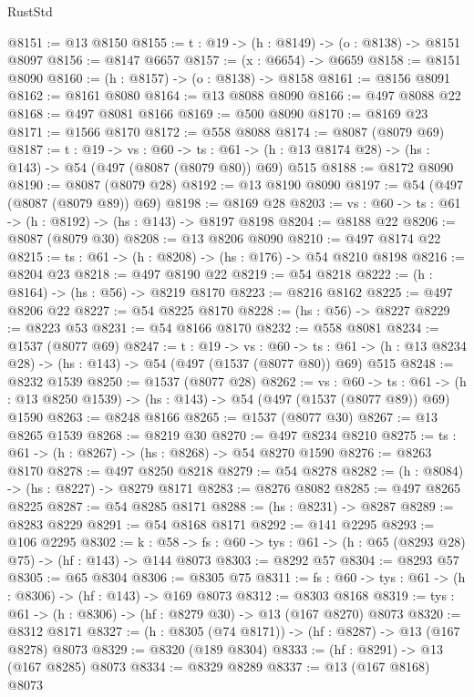 \begin{lexlean}{RustStd}
\begin{coremodule}
@8151 := @13 @8150
@8155 := {t : @19} -> (h : @8149) -> (o : @8138) -> @8151 @8097
@8156 := @8147 @6657
@8157 := (x : @6654) -> @6659
@8158 := @8151 @8090
@8160 := (h : @8157) -> (o : @8138) -> @8158
@8161 := @8156 @8091
@8162 := @8161 @8080
@8164 := @13 @8088 @8090
@8166 := @497 @8088 @22
@8168 := @497 @8081 @8166
@8169 := @500 @8090
@8170 := @8169 @23
@8171 := @1566 @8170
@8172 := @558 @8088
@8174 := @8087 (@8079 @69)
@8187 := {t : @19} ->
  {vs : @60} ->
  {ts : @61} -> (h : @13 @8174 @28) -> (hs : @143) -> @54 (@497 (@8087 (@8079 @80)) @69) @515
@8188 := @8172 @8090
@8190 := @8087 (@8079 @28)
@8192 := @13 @8190 @8090
@8197 := @54 (@497 (@8087 (@8079 @89)) @69)
@8198 := @8169 @28
@8203 := {vs : @60} -> {ts : @61} -> (h : @8192) -> (hs : @143) -> @8197 @8198
@8204 := @8188 @22
@8206 := @8087 (@8079 @30)
@8208 := @13 @8206 @8090
@8210 := @497 @8174 @22
@8215 := {ts : @61} -> (h : @8208) -> (hs : @176) -> @54 @8210 @8198
@8216 := @8204 @23
@8218 := @497 @8190 @22
@8219 := @54 @8218
@8222 := (h : @8164) -> (hs : @56) -> @8219 @8170
@8223 := @8216 @8162
@8225 := @497 @8206 @22
@8227 := @54 @8225 @8170
@8228 := (hs : @56) -> @8227
@8229 := @8223 @53
@8231 := @54 @8166 @8170
@8232 := @558 @8081
@8234 := @1537 (@8077 @69)
@8247 := {t : @19} ->
  {vs : @60} ->
  {ts : @61} -> (h : @13 @8234 @28) -> (hs : @143) -> @54 (@497 (@1537 (@8077 @80)) @69) @515
@8248 := @8232 @1539
@8250 := @1537 (@8077 @28)
@8262 := {vs : @60} ->
  {ts : @61} -> (h : @13 @8250 @1539) -> (hs : @143) -> @54 (@497 (@1537 (@8077 @89)) @69) @1590
@8263 := @8248 @8166
@8265 := @1537 (@8077 @30)
@8267 := @13 @8265 @1539
@8268 := @8219 @30
@8270 := @497 @8234 @8210
@8275 := {ts : @61} -> (h : @8267) -> (hs : @8268) -> @54 @8270 @1590
@8276 := @8263 @8170
@8278 := @497 @8250 @8218
@8279 := @54 @8278
@8282 := (h : @8084) -> (hs : @8227) -> @8279 @8171
@8283 := @8276 @8082
@8285 := @497 @8265 @8225
@8287 := @54 @8285 @8171
@8288 := (hs : @8231) -> @8287
@8289 := @8283 @8229
@8291 := @54 @8168 @8171
@8292 := @141 @2295
@8293 := @106 @2295
@8302 := {k : @58} ->
  {fs : @60} -> {tys : @61} -> (h : @65 (@8293 @28) @75) -> (hf : @143) -> @144 @8073
@8303 := @8292 @57
@8304 := @8293 @57
@8305 := @65 @8304
@8306 := @8305 @75
@8311 := {fs : @60} -> {tys : @61} -> (h : @8306) -> (hf : @143) -> @169 @8073
@8312 := @8303 @8168
@8319 := {tys : @61} -> (h : @8306) -> (hf : @8279 @30) -> @13 (@167 @8270) @8073
@8320 := @8312 @8171
@8327 := (h : @8305 (@74 @8171)) -> (hf : @8287) -> @13 (@167 @8278) @8073
@8329 := @8320 (@189 @8304)
@8333 := (hf : @8291) -> @13 (@167 @8285) @8073
@8334 := @8329 @8289
@8337 := @13 (@167 @8168) @8073

\end{coremodule}
\end{lexlean}
